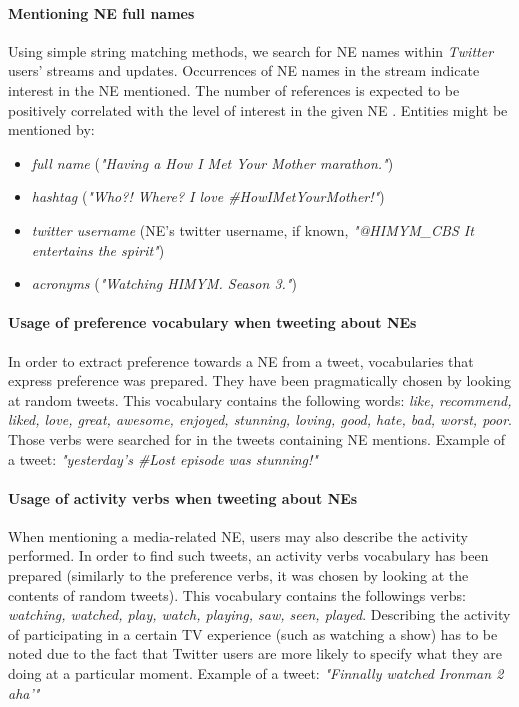 \paragraph{Mentioning NE full names}
Using simple string matching methods, we search for NE names within \textit{Twitter} users' streams and updates.
Occurrences of NE names in the stream indicate interest in the NE mentioned. The
number of references is expected to be positively correlated with the level of interest in the given NE \cite{twitter-content-is-it}.
Entities might be mentioned by:
\begin{itemize}
  \item \textit{full name} (\eg \textit{"Having a How I Met Your Mother marathon."})
  \item \textit{hashtag} (\eg \textit{"Who?! Where? I love \#HowIMetYourMother!"})
  \item \textit{twitter username} (NE's twitter username, if known, \eg \textit{"@HIMYM\_CBS It entertains the spirit"})
  \item \textit{acronyms} (\eg \textit{"Watching HIMYM. Season 3."})
\end{itemize}
\paragraph{Usage of preference vocabulary when tweeting about NEs}
In order to extract preference towards a NE from a tweet, vocabularies that express
preference was prepared. They have been pragmatically chosen by looking at random tweets.
This vocabulary contains the following words: \textit{like, recommend, liked, love, great,
awesome, enjoyed, stunning, loving, good, hate, bad, worst, poor}.
Those verbs were searched for in the tweets containing NE mentions.
Example of a tweet: \textit{"yesterday's \#Lost episode was stunning!"}
\paragraph{Usage of activity verbs when tweeting about NEs}
When mentioning a media-related NE, users may also describe the activity performed.
In order to find such tweets, an activity verbs vocabulary has been prepared (similarly to
the preference verbs, it was chosen by looking at the contents of random tweets).
This vocabulary contains the followings verbs: \textit{watching, watched, play,
watch, playing, saw, seen, played}.
Describing the activity of participating in a certain TV experience (such
as watching a show) has to be noted due to the fact that Twitter users are more
likely to specify what they are doing at a particular moment.
Example of a tweet: \textit{"Finnally watched Ironman 2 aha'"}

